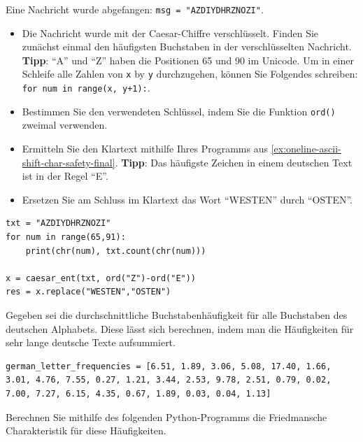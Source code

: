 \begin{myexercise}
Eine Nachricht wurde abgefangen: \lstinline|msg = "AZDIYDHRZNOZI"|.

\begin{itemize}
\item Die Nachricht wurde mit der Caesar-Chiffre verschlüsselt. Finden Sie  zunächst einmal den häufigsten Buchstaben in der verschlüsselten Nachricht. \textbf{Tipp}: \enquote{A} und \enquote{Z} haben die Positionen 65 und 90 im Unicode. Um in einer Schleife alle Zahlen von \texttt{x} by \texttt{y} durchzugehen, können Sie Folgendes schreiben: \lstinline|for num in range(x, y+1):|.

\item Bestimmen Sie den verwendeten Schlüssel, indem Sie die Funktion \lstinline|ord()| zweimal verwenden.

\item Ermitteln Sie den Klartext mithilfe Ihres Programms aus \cref{ex:oneline-ascii-shift-char-safety-final}. \textbf{Tipp}: Das häufigste Zeichen in einem deutschen Text ist in der Regel \enquote{E}.

\item Ersetzen Sie am Schluss im Klartext das Wort \enquote{WESTEN} durch \enquote{OSTEN}.

\end{itemize}
\begin{myanswer}
\begin{lstlisting}
txt = "AZDIYDHRZNOZI"
for num in range(65,91):
    print(chr(num), txt.count(chr(num)))
    
x = caesar_ent(txt, ord("Z")-ord("E"))
res = x.replace("WESTEN","OSTEN")
\end{lstlisting}
\end{myanswer}
\end{myexercise}

\begin{myexercise}
Gegeben sei die durchschnittliche Buchstabenhäufigkeit für alle Buchstaben des deutschen Alphabets. Diese lässt sich berechnen, indem man die Häufigkeiten für sehr lange deutsche Texte aufsummiert.

\begin{lstlisting}[numbers=none]
german_letter_frequencies = [6.51, 1.89, 3.06, 5.08, 17.40, 1.66, 3.01, 4.76, 7.55, 0.27, 1.21, 3.44, 2.53, 9.78, 2.51, 0.79, 0.02, 7.00, 7.27, 6.15, 4.35, 0.67, 1.89, 0.03, 0.04, 1.13]
\end{lstlisting}

Berechnen Sie mithilfe des folgenden Python-Programms die Friedmansche Charakteristik für diese Häufigkeiten.

\end{myexercise}


